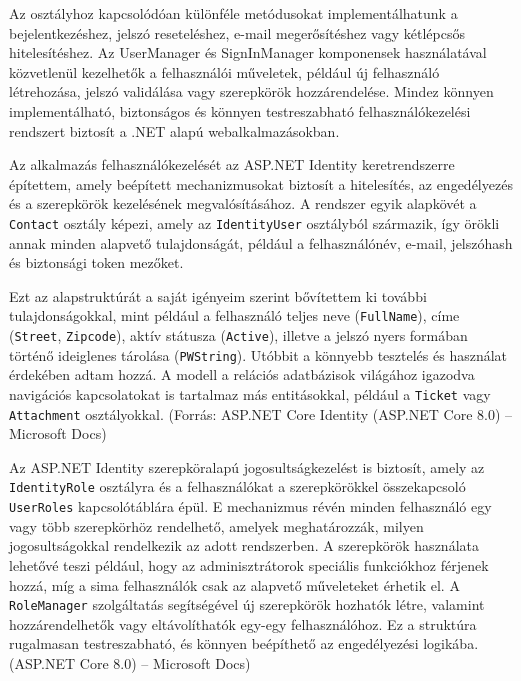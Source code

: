 Az osztályhoz kapcsolódóan különféle metódusokat implementálhatunk a bejelentkezéshez, jelszó reseteléshez, e-mail megerősítéshez vagy kétlépcsős hitelesítéshez. Az UserManager és SignInManager komponensek használatával közvetlenül kezelhetők a felhasználói műveletek, például új felhasználó létrehozása, jelszó validálása vagy szerepkörök hozzárendelése. Mindez könnyen implementálható, biztonságos és könnyen testreszabható felhasználókezelési rendszert biztosít a .NET alapú webalkalmazásokban.

Az alkalmazás felhasználókezelését az ASP.NET Identity keretrendszerre építettem, amely beépített mechanizmusokat biztosít a hitelesítés, az engedélyezés és a szerepkörök kezelésének megvalósításához. A rendszer egyik alapkövét a \texttt{Contact} osztály képezi, amely az \texttt{IdentityUser} osztályból származik, így örökli annak minden alapvető tulajdonságát, például a felhasználónév, e-mail, jelszóhash és biztonsági token mezőket.

Ezt az alapstruktúrát a saját igényeim szerint bővítettem ki további tulajdonságokkal, mint például a felhasználó teljes neve (\texttt{FullName}), címe (\texttt{Street}, \texttt{Zipcode}), aktív státusza (\texttt{Active}), illetve a jelszó nyers formában történő ideiglenes tárolása (\texttt{PWString}). Utóbbit a könnyebb tesztelés és használat érdekében adtam hozzá. A modell a relációs adatbázisok világához igazodva navigációs kapcsolatokat is tartalmaz más entitásokkal, például a \texttt{Ticket} vagy \texttt{Attachment} osztályokkal. (Forrás: ASP.NET Core Identity (ASP.NET Core 8.0) – Microsoft Docs)

Az ASP.NET Identity szerepköralapú jogosultságkezelést is biztosít, amely az \texttt{IdentityRole} osztályra és a felhasználókat a szerepkörökkel összekapcsoló \texttt{UserRoles} kapcsolótáblára épül. E mechanizmus révén minden felhasználó egy vagy több szerepkörhöz rendelhető, amelyek meghatározzák, milyen jogosultságokkal rendelkezik az adott rendszerben. A szerepkörök használata lehetővé teszi például, hogy az adminisztrátorok speciális funkciókhoz férjenek hozzá, míg a sima felhasználók csak az alapvető műveleteket érhetik el. A \texttt{RoleManager} szolgáltatás segítségével új szerepkörök hozhatók létre, valamint hozzárendelhetők vagy eltávolíthatók egy-egy felhasználóhoz. Ez a struktúra rugalmasan testreszabható, és könnyen beépíthető az engedélyezési logikába. (ASP.NET Core 8.0) – Microsoft Docs)



